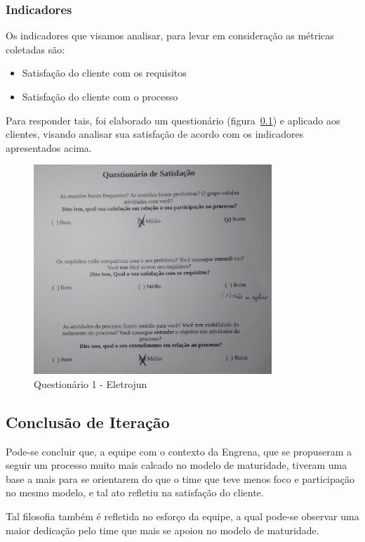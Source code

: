 \subsubsection{Indicadores}

Os indicadores que visamos analisar, para levar em consideração as métricas coletadas são:
\begin{itemize}
\item Satisfação do cliente com os requisitos
\item Satisfação do cliente com o processo
\end{itemize}

Para responder tais, foi elaborado um questionário (figura~\ref{}) e aplicado aos clientes, visando analisar sua satisfação de acordo com os indicadores apresentados acima.

\begin{figure}[H]
  \center
  \includegraphics[width=0.8\textwidth]{figuras/quest2}
  \caption{Questionário 1 - Eletrojun}
  \label{fig:quest2}
\end{figure}


\subsection{Conclusão de Iteração}

Pode-se concluir que, a equipe com o contexto da Engrena, que se propuseram a seguir um processo muito mais calcado no modelo de maturidade, tiveram uma base a mais para se orientarem do que o time que teve menos foco e participação no mesmo modelo, e tal ato refletiu na satisfação do cliente.

Tal filosofia também é refletida no esforço da equipe, a qual pode-se observar uma maior dedicação pelo time que mais se apoiou no modelo de maturidade.

